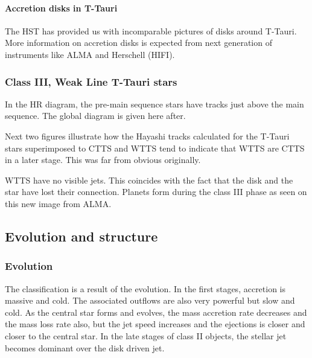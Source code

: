 \documentclass[10pt,a4paper,english]{article}
\begin{document}

\paragraph{Accretion disks in T-Tauri}


The HST has provided us with incomparable pictures of disks around T-Tauri.
More information on accretion disks is expected from next generation of
instruments like ALMA and Herschell (HIFI).

\subsubsection{Class III, Weak Line T-Tauri stars}

In the HR diagram, the pre-main sequence stars have tracks just above the main
sequence. The global diagram is given here after.


Next two figures illustrate how the Hayashi tracks calculated for the T-Tauri
stars superimposed to CTTS and WTTS tend to indicate that WTTS are CTTS in a
later stage. This was far from obvious originally.


WTTS have no visible jets. This coincides with the fact that the disk and the
star have lost their connection. Planets form during the class III phase as
seen on this new image from ALMA.


\subsection{Evolution and structure}

\subsubsection{Evolution}

The classification is a result of the evolution. In the first stages, accretion
is massive and cold. The associated outflows are also very powerful but slow
and cold. As the central star forms and evolves, the mass accretion rate
decreases and the mass loss rate also, but the jet speed increases and the
ejections is closer and closer to the central star. In the late stages of class
II objects, the stellar jet becomes dominant over the disk driven jet.
\end{document}
